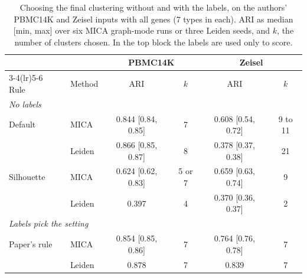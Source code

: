 \begin{table}[t]
\centering
\caption{Choosing the final clustering without and with the labels, on the authors' PBMC14K and Zeisel inputs with all genes (7 types in each). ARI as median [min, max] over six MICA graph-mode runs or three Leiden seeds, and $k$, the number of clusters chosen. In the top block the labels are used only to score.}
\label{tab:selection}
\scriptsize
\setlength{\tabcolsep}{2.4pt}
\begin{tabular}{llcccc}
\toprule
 & & \multicolumn{2}{c}{PBMC14K} & \multicolumn{2}{c}{Zeisel} \\
\cmidrule(lr){3-4}\cmidrule(lr){5-6}
Rule & Method & ARI & $k$ & ARI & $k$ \\
\midrule
\multicolumn{6}{l}{\textit{No labels}} \\
Default & MICA & 0.844 [0.84, 0.85] & 7 & 0.608 [0.54, 0.72] & 9 to 11 \\
 & Leiden & 0.866 [0.85, 0.87] & 8 & 0.378 [0.37, 0.38] & 21 \\
Silhouette & MICA & 0.624 [0.62, 0.83] & 5 or 7 & 0.659 [0.63, 0.74] & 9 \\
 & Leiden & 0.397 & 4 & 0.370 [0.36, 0.37] & 2 \\
\midrule
\multicolumn{6}{l}{\textit{Labels pick the setting}} \\
Paper's rule & MICA & 0.854 [0.85, 0.86] & 7 & 0.764 [0.76, 0.78] & 7 \\
 & Leiden & 0.878 & 7 & 0.839 & 7 \\
\bottomrule
\end{tabular}
\end{table}
